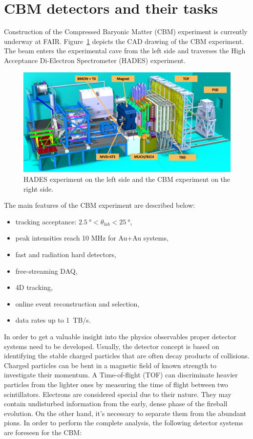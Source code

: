 

\section{CBM detectors and their tasks}
Construction of the Compressed Baryonic Matter (\gls{CBM}) experiment is currently underway at \gls{FAIR}. Figure~\ref{fig:exp} depicts the CAD drawing of the \gls{CBM} experiment. The beam enters the experimental cave from the left side and traverses the High Acceptance Di-Electron Spectrometer (\gls{HADES}) experiment. 

\begin{figure}[!h]
    \centering
    \includegraphics[width=0.95\columnwidth]{Chapter1/images/CBMnew.png}
    \caption{HADES experiment on the left side and the \gls{CBM} experiment on the right side.}
    \label{fig:exp}
\end{figure}

The main features of the \gls{CBM} experiment are described below:
\begin{itemize}
\item tracking acceptance: $\SI{2.5}{\degree} < \theta_{lab} < \SI{25}{\degree}$,
\item peak intensities reach 10 MHz for Au+Au systems,
\item fast and radiation hard detectors,
\item free-streaming \gls{DAQ},
\item 4D tracking,
\item online event reconstruction and selection,
\item data rates up to 1~TB/s.
\end{itemize}


In order to get a valuable insight into the physics observables proper detector systems need to be developed. Usually, the detector concept is based on identifying the stable charged particles that are often decay products of collisions. Charged particles can be bent in a magnetic field of known strength to investigate their momentum. A Time-of-flight (\gls{TOF}) can discriminate heavier particles from the lighter ones by measuring the time of flight between two scintillators. Electrons are considered special due to their nature. They may contain undisturbed information from the early, dense phase of the fireball evolution. On the other hand, it's necessary to separate them from the abundant pions. In order to perform the complete analysis, the following detector systems are foreseen for the \gls{CBM}:


